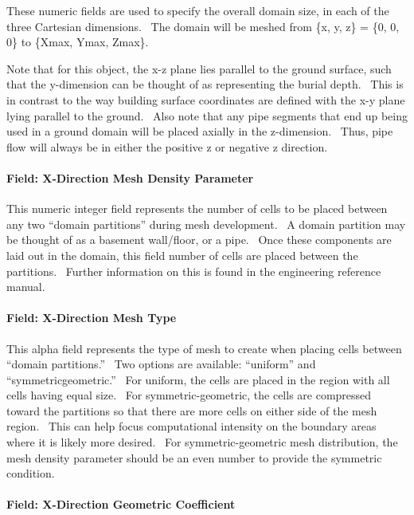 These numeric fields are used to specify the overall domain size, in each of the three Cartesian dimensions.~ The domain will be meshed from \{x, y, z\} = \{0, 0, 0\} to \{Xmax, Ymax, Zmax\}.

Note that for this object, the x-z plane lies parallel to the ground surface, such that the y-dimension can be thought of as representing the burial depth.~ This is in contrast to the way building surface coordinates are defined with the x-y plane lying parallel to the ground.~ Also note that any pipe segments that end up being used in a ground domain will be placed axially in the z-dimension.~ Thus, pipe flow will always be in either the positive z or negative z direction.

\paragraph{Field: X-Direction Mesh Density Parameter}\label{field-x-direction-mesh-density-parameter}

This numeric integer field represents the number of cells to be placed between any two ``domain partitions'' during mesh development.~ A domain partition may be thought of as a basement wall/floor, or a pipe.~ Once these components are laid out in the domain, this field number of cells are placed between the partitions.~ Further information on this is found in the engineering reference manual.

\paragraph{Field: X-Direction Mesh Type}\label{field-x-direction-mesh-type}

This alpha field represents the type of mesh to create when placing cells between ``domain partitions.''~ Two options are available: ``uniform'' and ``symmetricgeometric.''~ For uniform, the cells are placed in the region with all cells having equal size.~ For symmetric-geometric, the cells are compressed toward the partitions so that there are more cells on either side of the mesh region.~ This can help focus computational intensity on the boundary areas where it is likely more desired.~ For symmetric-geometric mesh distribution, the mesh density parameter should be an even number to provide the symmetric condition.

\paragraph{Field: X-Direction Geometric Coefficient}\label{field-x-direction-geometric-coefficient}

